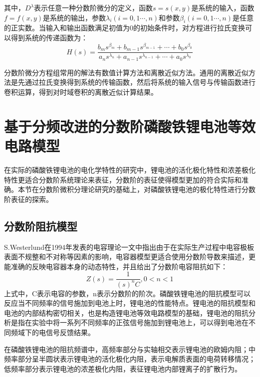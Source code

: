 其中，${{D}^{\lambda }}$表示任意一种分数阶微分的定义，函数$s=s\left( x,y \right)$是系统的输入，函数$f=f\left( x,y \right)$是系统的输出，参数${{\lambda }_{i}}\left( i=0,1\cdots ,n \right)$和参数${{\beta }_{i}}\left( i=0,1\cdots ,n \right)$是任意的正实数。当输入和输出函数满足初值为0的初始条件时，对方程进行拉氏变换可以得到系统的传递函数为：
\begin{equation}
H\left( s \right)=\frac{{{b}_{m}}{{s}^{{{\beta }_{m}}}}+{{b}_{m-1}}{{s}^{{{\beta }_{m-1}}}}+\cdots +{{b}_{0}}{{s}^{{{\beta }_{0}}}}}{{{a}_{n}}{{s}^{{{\lambda }_{n}}}}+{{a}_{n-1}}{{s}^{{{\lambda }_{n-1}}}}+\cdots +{{a}_{0}}{{s}^{{{\lambda }_{0}}}}}
\end{equation}

分数阶微分方程组常用的解法有数值计算方法和离散近似方法。通用的离散近似方法是先通过拉氏变换得到系统的传输函数，然后将系统的输入信号与传输函数进行卷积运算，得到对时域卷积的离散近似计算结果。

\section{基于分频改进的分数阶磷酸铁锂电池等效电路模型}
在实际的磷酸铁锂电池的电化学特性的研究中，锂电池的活化极化特性和浓差极化特性更适合分数阶系统理论来表征，分数阶的表征使得模型更加的符合实际和准确。本节在分数阶微积分理论研究的基础上，对磷酸铁锂电池的极化特性进行分数阶表征的探索。
\subsection{分数阶阻抗模型}
S.Westerlund在1994年发表的电容理论一文中指出由于在实际生产过程中电容极板表面不规整和不对称等因素的影响，电容器模型更适合使用分数阶导数来描述，更能准确的反映电容器本身的动态特性，并且给出了分数阶电容阻抗如下：
\begin{equation}
Z\left( s \right)=\frac{1}{{{\left( s \right)}^{n}}C},0<n<1
\end{equation}
上式中，C表示电容的参数，n表示分数阶的阶次。磷酸铁锂电池的阻抗模型可以反应当不同频率的信号施加到电池上时，锂电池的性能特点。锂电池的阻抗模型和电池的内部结构密切相关，也是构造锂电池等效电路模型的基础，锂电池的阻抗分析是指在实验中将一系列不同频率的正弦信号施加到锂电池上，可以得到电池在不同频域下的电信号反馈结果。

在磷酸铁锂电池的阻抗频谱中，高频率部分与实轴相交表示锂电池的欧姆内阻；中频率部分呈半圆状表示锂电池的活化极化内阻，表示电解质表面的电荷转移情况；低频率部分表示锂电池的浓差极化内阻，表征锂电池内部锂离子的扩散行为。
